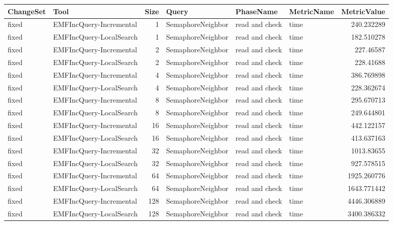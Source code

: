 \begin{table}
\centering
\footnotesize
\begin{tabular}{| l | l | r | l | l | l | r |}
\hline
\sf ChangeSet & \sf Tool & \sf Size & \sf Query & \sf PhaseName & \sf MetricName & \sf MetricValue\\\hline

fixed & EMFIncQuery-Incremental & 1 & SemaphoreNeighbor & read and check & time & 240.232289\\\hline
fixed & EMFIncQuery-LocalSearch & 1 & SemaphoreNeighbor & read and check & time & 182.510278\\\hline
fixed & EMFIncQuery-Incremental & 2 & SemaphoreNeighbor & read and check & time & 227.46587\\\hline
fixed & EMFIncQuery-LocalSearch & 2 & SemaphoreNeighbor & read and check & time & 228.41688\\\hline
fixed & EMFIncQuery-Incremental & 4 & SemaphoreNeighbor & read and check & time & 386.769898\\\hline
fixed & EMFIncQuery-LocalSearch & 4 & SemaphoreNeighbor & read and check & time & 228.362674\\\hline
fixed & EMFIncQuery-Incremental & 8 & SemaphoreNeighbor & read and check & time & 295.670713\\\hline
fixed & EMFIncQuery-LocalSearch & 8 & SemaphoreNeighbor & read and check & time & 249.644801\\\hline
fixed & EMFIncQuery-Incremental & 16 & SemaphoreNeighbor & read and check & time & 442.122157\\\hline
fixed & EMFIncQuery-LocalSearch & 16 & SemaphoreNeighbor & read and check & time & 413.637163\\\hline
fixed & EMFIncQuery-Incremental & 32 & SemaphoreNeighbor & read and check & time & 1013.83655\\\hline
fixed & EMFIncQuery-LocalSearch & 32 & SemaphoreNeighbor & read and check & time & 927.578515\\\hline
fixed & EMFIncQuery-Incremental & 64 & SemaphoreNeighbor & read and check & time & 1925.260776\\\hline
fixed & EMFIncQuery-LocalSearch & 64 & SemaphoreNeighbor & read and check & time & 1643.771442\\\hline
fixed & EMFIncQuery-Incremental & 128 & SemaphoreNeighbor & read and check & time & 4446.306889\\\hline
fixed & EMFIncQuery-LocalSearch & 128 & SemaphoreNeighbor & read and check & time & 3400.386332\\\hline

\end{tabular}
\end{table}
